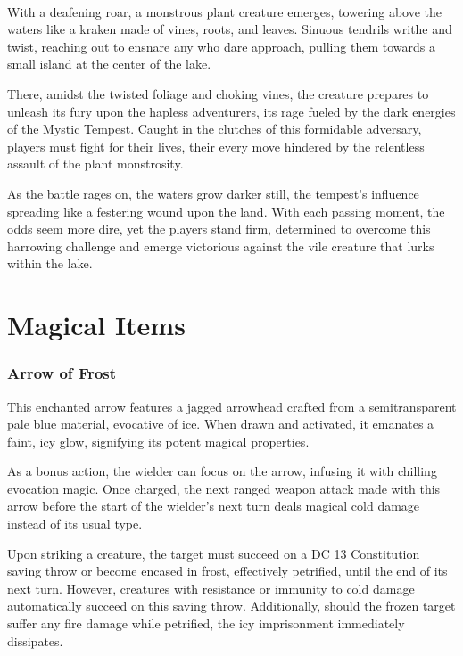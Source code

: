 \vfill\eject

\vspace*{3.5cm}\hfill\\
With a deafening roar, a monstrous plant creature emerges, towering above the waters like a kraken made of vines, roots, and leaves. Sinuous tendrils writhe and twist, reaching out to ensnare any who dare approach, pulling them towards a small island at the center of the lake.

There, amidst the twisted foliage and choking vines, the creature prepares to unleash its fury upon the hapless adventurers, its rage fueled by the dark energies of the Mystic Tempest. Caught in the clutches of this formidable adversary, players must fight for their lives, their every move hindered by the relentless assault of the plant monstrosity.

As the battle rages on, the waters grow darker still, the tempest's influence spreading like a festering wound upon the land. With each passing moment, the odds seem more dire, yet the players stand firm, determined to overcome this harrowing challenge and emerge victorious against the vile creature that lurks within the lake.
	
\DungeonSheetGeometry

\chapter{Magical Items}
\subsection*{Arrow of Frost}
This enchanted arrow features a jagged arrowhead crafted from a semitransparent pale blue material, evocative of ice. When drawn and activated, it emanates a faint, icy glow, signifying its potent magical properties.

As a bonus action, the wielder can focus on the arrow, infusing it with chilling evocation magic. Once charged, the next ranged weapon attack made with this arrow before the start of the wielder's next turn deals magical cold damage instead of its usual type.

Upon striking a creature, the target must succeed on a DC 13 Constitution saving throw or become encased in frost, effectively petrified, until the end of its next turn. However, creatures with resistance or immunity to cold damage automatically succeed on this saving throw. Additionally, should the frozen target suffer any fire damage while petrified, the icy imprisonment immediately dissipates.

